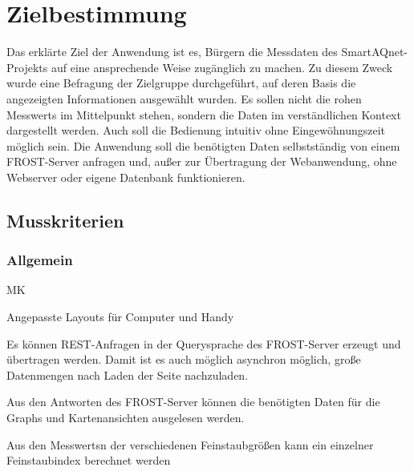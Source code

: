 \section{Zielbestimmung}
Das erklärte Ziel der Anwendung ist es, Bürgern die Messdaten des \gls{SmartAQnet}-Projekts auf eine ansprechende Weise zugänglich zu machen.
Zu diesem Zweck wurde eine Befragung der Zielgruppe durchgeführt, auf deren Basis die angezeigten Informationen ausgewählt wurden.
Es sollen nicht die rohen \glspl{Messwert} im Mittelpunkt stehen, sondern die Daten im verständlichen Kontext dargestellt werden.
Auch soll die Bedienung intuitiv ohne Eingewöhnungszeit möglich sein.
Die Anwendung soll die benötigten Daten selbstständig von einem \gls{FROST-Server} anfragen und, außer zur Übertragung der \gls{Webanwendung}, ohne \gls{Webserver} oder eigene Datenbank funktionieren.

\subsection{Musskriterien}
\setcounter{counter}{10}

\subsubsection*{Allgemein}
\begin{Kriterien}{MK}

	\item Angepasste Layouts für Computer und \gls{Handy}
	
	\item Es können REST-Anfragen in der \gls{Querysprache} des \gls{FROST-Server} erzeugt und übertragen werden.
		Damit ist es auch möglich asynchron möglich, große Datenmengen nach Laden der Seite nachzuladen.
	
	\item Aus den Antworten des \gls{FROST-Server} können die benötigten Daten für die \glspl{Graph} und Kartenansichten ausgelesen werden.
	
	\item Aus den \glspl{Messwert}n der verschiedenen Feinstaubgrößen kann ein einzelner \gls{Feinstaubindex} berechnet werden
\end{Kriterien}

